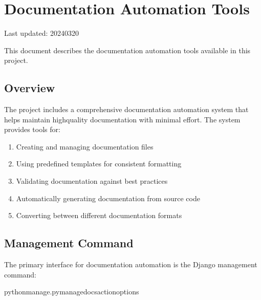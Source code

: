 \documentclass[letterpaper,10pt,english]{sphinxmanual}
\begin{document}
\sphinxstepscope


\section{Documentation Automation Tools}
\label{\detokenize{documentation_tools:documentation-automation-tools}}\label{\detokenize{documentation_tools::doc}}
\sphinxAtStartPar
Last updated: 2024\sphinxhyphen{}03\sphinxhyphen{}20

\sphinxAtStartPar
This document describes the documentation automation tools available in this project.


\subsection{Overview}
\label{\detokenize{documentation_tools:overview}}
\sphinxAtStartPar
The project includes a comprehensive documentation automation system that helps maintain high\sphinxhyphen{}quality documentation with minimal effort. The system provides tools for:
\begin{enumerate}
%
\item {} 
\sphinxAtStartPar
Creating and managing documentation files

\item {} 
\sphinxAtStartPar
Using pre\sphinxhyphen{}defined templates for consistent formatting

\item {} 
\sphinxAtStartPar
Validating documentation against best practices

\item {} 
\sphinxAtStartPar
Automatically generating documentation from source code

\item {} 
\sphinxAtStartPar
Converting between different documentation formats

\end{enumerate}


\subsection{Management Command}
\label{\detokenize{documentation_tools:management-command}}
\sphinxAtStartPar
The primary interface for documentation automation is the  Django management command:

\begin{sphinxVerbatim}[commandchars=\\\{\}]
pythonmanage.pymanage\PYGZus{}docs\PYG{o}{[}action\PYG{o}{]}\PYG{o}{[}options\PYG{o}{]}
\end{sphinxVerbatim}
\end{document}
